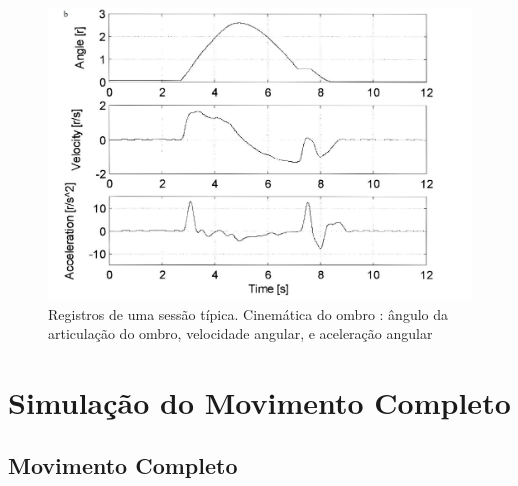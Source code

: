 \begin{figure}[H]
\centering
\includegraphics[width = 1\textwidth]{img/Rosen1999_ativacao.JPG}
\caption[Resposta ao Movimento de Flexão seguido de Extensão em um Ombro]{Registros de uma sessão típica. Cinemática do ombro : ângulo da articulação do ombro, velocidade angular, e aceleração angular \cite{rosen1999performances}}
\label{rosen_ativacao}
\end{figure}

\section{Simulação do Movimento Completo}
\label{resultado_simulacao}

\subsection{Movimento Completo}
